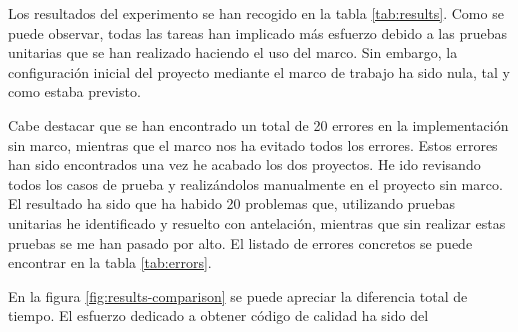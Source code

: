 Los resultados del experimento se han recogido en la tabla \cref{tab:results}. Como se puede observar, todas las tareas han implicado más esfuerzo debido a las pruebas unitarias que se han realizado haciendo el uso del marco. Sin embargo, la configuración inicial del proyecto mediante el marco de trabajo ha sido nula, tal y como estaba previsto.

Cabe destacar que se han encontrado un total de 20 errores en la implementación sin marco, mientras que el marco nos ha evitado todos los errores. Estos errores han sido encontrados una vez he acabado los dos proyectos. He ido revisando todos los casos de prueba y realizándolos manualmente en el proyecto sin marco. El resultado ha sido que ha habido 20 problemas que, utilizando pruebas unitarias he identificado y resuelto con antelación, mientras que sin realizar estas pruebas se me han pasado por alto. El listado de errores concretos se puede encontrar en la tabla \cref{tab:errors}.

En la figura \cref{fig:results-comparison} se puede apreciar la diferencia total de tiempo. El esfuerzo dedicado a obtener código de calidad ha sido del

